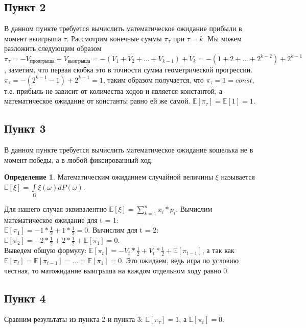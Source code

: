 \documentclass[a4paper]{article}
\theoremstyle{definition}
\newtheorem{definition}{Определение}[section]
\begin{document}
\subsection{Пункт 2}
    В данном пункте требуется вычислить математическое ожидание прибыли в момент выигрыша $\tau$. 
    Рассмотрим конечные суммы $\pi_\tau$ при $\tau = k$. Мы можем разложить следующим образом $\pi_\tau = -V_{\text{проигрыша}} + V_{\text{выигрыша}} 
    = -(V_1 + V_2 + ... + V_{k-1}) + V_k = -(1 + 2 + ... + 2^{k-2}) + 2^{k-1}$, заметим, что первая скобка это в точности сумма геометрической прогрессии.
    $\pi_\tau = - (2^{k-1} - 1) + 2^{k-1} = 1$, таким образом получается, что $\pi_\tau = 1 = const$, т.е. прибыль не зависит от количества ходов и является константой, а математическое ожидание от константы равно ей же самой.
    $\mathbb{E}[\pi_\tau] = \mathbb{E}[1] = 1$.

\subsection{Пункт 3}
    В данном пункте требуется вычислить математическое ожидание кошелька не в момент победы, а в любой фиксированный ход.
    
    \begin{definition}
        Математическим ожиданием случайной величины $\xi$ называется $\mathbb{E}[\xi] = \int\limits_\Omega \xi(\omega) dP(\omega)$.
    \end{definition}

    Для нашего случая эквивалентно $\mathbb{E}[\xi] = \sum_{k=1}^{n} x_i * p_i$.
    Вычислим математическое ожидание для t = 1: \\ 
    $\mathbb{E}[\pi_1] = -1 * \frac{1}{2} + 1 * \frac{1}{2} = 0$. Вычислим для t = 2: $\mathbb{E}[\pi_2] = -2 * \frac{1}{2} + 2 * \frac{1}{2} + \mathbb{E}[\pi_1] = 0$. \\
    Выведем общую формулу: $\mathbb{E}[\pi_t] = -V_t * \frac{1}{2} + V_t * \frac{1}{2} + \mathbb{E}[\pi_{t-1}]$, а так как $\mathbb{E}[\pi_t] = \mathbb{E}[\pi_{t-1}] = ... = \mathbb{E}[\pi_1] = 0$.
    Это ожидаем, ведь игра по условию честная, то матожидание выигрыша на каждом отдельном ходу равно 0.

\subsection{Пункт 4}
    Сравним результаты из пункта 2 и пункта 3: $\mathbb{E}[\pi_\tau] = 1$, а $\mathbb{E}[\pi_t] = 0$.
    
\end{document}
